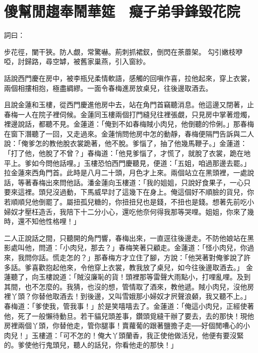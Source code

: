 %

\chapter{傻幫閒趨奉鬧華筵　癡子弟爭鋒毀花院}

詞曰：

步花徑，闌干狹。防人覷，常驚嚇。荊刺抓裙釵，倒閃在荼蘼架。
勾引嫩枝咿啞，討歸路，尋空罅，被舊家巢燕，引入窗紗。

話說西門慶在房中，被李瓶兒柔情軟語，感觸的回嗔作喜，拉他起來，穿上衣裳，兩個相摟相抱，極盡綢繆。一面令春梅進房放桌兒，往後邊取酒去。

且說金蓮和玉樓，從西門慶進他房中去，站在角門首竊聽消息。他這邊又閉著，止春梅一人在院子裡伺候。金蓮同玉樓兩個打門縫兒往裡張覷，只見房中掌著燈燭，裡邊說話，都聽不見。金蓮道：「俺到不如春梅賊小肉兒，他倒聽的伶俐。」那春梅在窗下潛聽了一回，又走過來。金蓮悄問他房中怎的動靜，春梅便隔門告訴與二人說：「俺爹怎的教他脫衣裳跪著，他不脫。爹惱了，抽了他幾馬鞭子。」金蓮道：「打了他，他脫了不曾？」春梅道：「他見爹惱了，才慌了，就脫了衣裳，跪在地平上。爹如今問他話哩。」玉樓恐怕西門慶聽見，便道：「五姐，咱過那邊去罷。」拉金蓮來西角門首。此時是八月二十頭，月色才上來。兩個站立在黑頭裡，一處說話，等著春梅出來問他話。潘金蓮向玉樓道：「我的姐姐，只說好食果子，一心只要來這裡。頭兒沒過動，下馬威早討了這幾下在身上。俺這個好不順臉的貨兒，你若順順兒他倒罷了。屬扭孤兒糖的，你扭扭兒也是錢，不扭也是錢。想著先前吃小婦奴才壓枉造舌，我陪下十二分小心，還吃他奈何得我那等哭哩。姐姐，你來了幾時，還不知他性格哩！」

二人正說話之間，只聽開的角門響，春梅出來，一直逕往後邊走。不防他娘站在黑影處叫他，問道：「小肉兒，那去？」春梅笑著只顧走。金蓮道：「怪小肉兒，你過來，我問你話。慌走怎的？」那春梅方才立住了腳，方說：「他哭著對俺爹說了許多話。爹喜歡抱起他來，令他穿上衣裳，教我放了桌兒，如今往後邊取酒去。」 金蓮聽了，向玉樓說道：「賊沒廉恥的貨！頭裡那等雷聲大雨點小，打哩亂哩。及到其間，也不怎麼的。我猜，也沒的想，管情取了酒來，教他遞。賊小肉兒，沒他房裡丫頭？你替他取酒去！到後邊，又叫雪娥那小婦奴才屄聲浪顙，我又聽不上。」春梅道：「爹使我，管我事！」於是笑嘻嘻去了。金蓮道：「俺這小肉兒，正經使著他，死了一般懶待動旦。若干貓兒頭差事，鑽頭覓縫干辦了要去，去的那快！現他房裡兩個丫頭，你替他走，管你腿事！賣蘿葡的跟著鹽擔子走──好個閒嘈心的小肉兒！」玉樓道：「可不怎的！俺大丫頭蘭香，我正使他做活兒，他便有要沒緊的。爹使他行鬼頭兒，聽人的話兒，你看他走的那快！」

